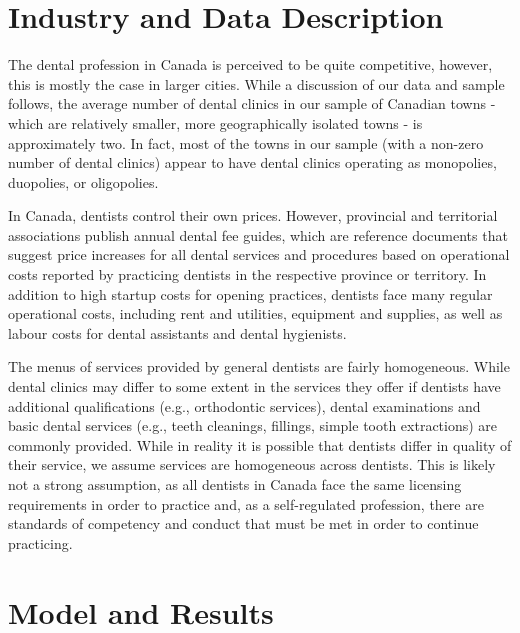 \documentclass[a4paper,11pt]{article}
\begin{document}
\section{Industry and Data Description}
The dental profession in Canada is perceived to be quite competitive, however, this is mostly the case in larger cities. While a discussion of our data and sample follows, the average number of dental clinics in our sample of Canadian towns - which are relatively smaller, more geographically isolated towns - is approximately two. In fact, most of the towns in our sample (with a non-zero number of dental clinics) appear to have dental clinics operating as monopolies, duopolies, or oligopolies.

In Canada, dentists control their own prices. However, provincial and territorial associations publish annual dental fee guides, which are reference documents that suggest price increases for all dental services and procedures based on operational costs reported by practicing dentists in the respective province or territory. In addition to high startup costs for opening practices, dentists face many regular operational costs, including rent and utilities, equipment and supplies, as well as labour costs for dental assistants and dental hygienists.

The menus of services provided by general dentists are fairly homogeneous. While dental clinics may differ to some extent in the services they offer if dentists have additional qualifications (e.g., orthodontic services), dental examinations and basic dental services (e.g., teeth cleanings, fillings, simple tooth extractions) are commonly provided. While in reality it is possible that dentists differ in quality of their service, we assume services are homogeneous across dentists. This is likely not a strong assumption, as all dentists in Canada face the same licensing requirements in order to practice and, as a self-regulated profession, there are standards of competency and conduct that must be met in order to continue practicing.

\section{Model and Results}
\end{document}
